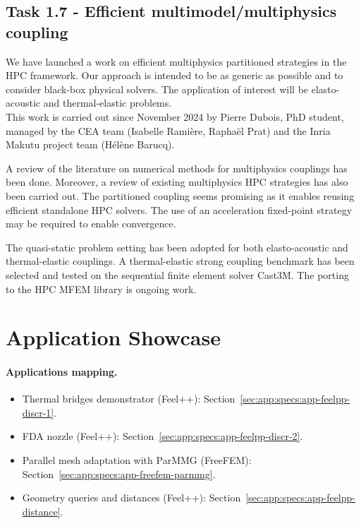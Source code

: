 \subsection{Task 1.7 -  Efficient multimodel/multiphysics coupling}
We have launched a work on efficient multiphysics partitioned strategies in the HPC framework. Our approach is intended to be as generic as possible and to consider black-box physical solvers. The application of interest will be elasto-acoustic and thermal-elastic problems.\\
This work is carried out since November 2024 by Pierre Dubois, PhD student, managed by the CEA team (Isabelle Ramière, Raphaël Prat) and the Inria Makutu project team (Hélène Barucq).

A review of the literature on numerical methods for multiphysics couplings has been done. Moreover, a review of existing multiphysics HPC strategies has also been carried out. The partitioned coupling seems promising as it enables reusing efficient standalone HPC solvers. The use of an acceleration fixed-point strategy may be required to enable convergence.

The quasi-static problem setting has been adopted for both elasto-acoustic and thermal-elastic couplings. A thermal-elastic strong coupling benchmark has been selected and tested on the sequential finite element solver Cast3M. The porting to the HPC MFEM library is ongoing work.



\section{Application Showcase}

%   

\paragraph{Applications mapping.}
\begin{itemize}
    \item Thermal bridges demonstrator (Feel++): Section~\ref{sec:app:specs:app-feelpp-discr-1}.
    \item FDA nozzle (Feel++): Section~\ref{sec:app:specs:app-feelpp-discr-2}.
    \item Parallel mesh adaptation with ParMMG (FreeFEM): Section~\ref{sec:app:specs:app-freefem-parmmg}.
    \item Geometry queries and distances (Feel++): Section~\ref{sec:app:specs:app-feelpp-distance}.
\end{itemize}

